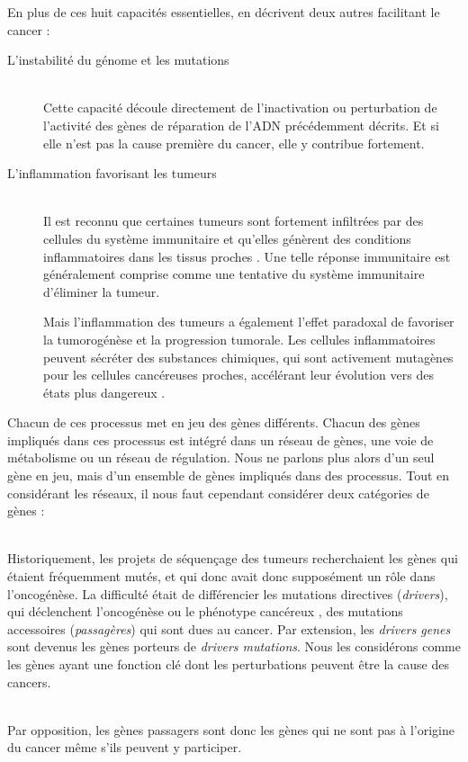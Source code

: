 			En plus de ces huit capacités essentielles, \citeauthor{Hanahan2011} en décrivent deux autres facilitant le cancer :
			\begin{description}
				\item [L'instabilité du génome et les mutations]    \hfill \\
					Cette capacité découle directement de l'inactivation ou perturbation de l'activité des gènes de réparation de l'\acs{ADN} précédemment décrits.
					Et si elle n'est pas la cause première du cancer, elle y contribue fortement.

				\item [L'inflammation favorisant les tumeurs]       \hfill \\
					Il est reconnu que certaines tumeurs sont fortement infiltrées par des cellules du système immunitaire et qu'elles génèrent des conditions inflammatoires dans les tissus proches \citep{Dvorak1986}.
					Une telle réponse immunitaire est généralement comprise comme une tentative du système immunitaire d'éliminer la tumeur.

					Mais l'inflammation des tumeurs a également l'effet paradoxal de favoriser la tumorogénèse et la progression tumorale.
					Les cellules inflammatoires peuvent sécréter des substances chimiques, qui sont activement mutagènes pour les cellules cancéreuses proches, accélérant leur évolution vers des états plus dangereux \citep{Grivennikov2010}.
			\end{description}
			\vspace{1.5ex}

			Chacun de ces processus met en jeu des gènes différents.
			Chacun des gènes impliqués dans ces processus est intégré dans un réseau de gènes, une voie de métabolisme ou un réseau de régulation.
			Nous ne parlons plus alors d'un seul gène en jeu, mais d'un ensemble de gènes impliqués dans des processus.
			Tout en considérant les réseaux, il nous faut cependant considérer deux catégories de gènes :
			\begin{description}\label{def:genes}
				\item [Les gènes directeurs (\emph{drivers genes})]    \hfill \\
					Historiquement, les projets de séquençage des tumeurs recherchaient les gènes qui étaient fréquemment mutés, et qui donc avait donc supposément un rôle dans l'oncogénèse.
					La difficulté était de différencier les mutations directives (\emph{drivers}), qui déclenchent l'oncogénèse ou le phénotype cancéreux \citep{Greenman2006, Sjoblom2006, Wood2007}, des mutations accessoires (\emph{passagères}) qui sont dues au cancer.
					Par extension, les \emph{drivers genes} sont devenus les gènes porteurs de \emph{drivers mutations}.
					Nous les considérons comme les gènes ayant une fonction clé dont les perturbations peuvent être la cause des cancers.
				\item [Les gènes passagers (\emph{passengers genes})] \hfill \\
					Par opposition, les gènes passagers sont donc les gènes qui ne sont pas à l'origine du cancer même s'ils peuvent y participer.
			\end{description}
			\vspace{1.5ex}

